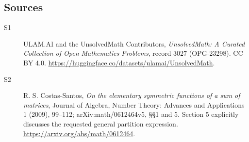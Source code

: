 \documentclass[11pt]{article}
\begin{document}
\subsection{Sources}
\begin{description}
\item[\hypertarget{source:3027:1}{S1}] ULAM.AI and the UnsolvedMath Contributors, \emph{UnsolvedMath: A Curated Collection of Open Mathematics Problems}, record 3027 (OPG-23298). CC BY 4.0. \url{https://huggingface.co/datasets/ulamai/UnsolvedMath}.
\item[\hypertarget{source:3027:2}{S2}] R. S. Costas-Santos, \emph{On the elementary symmetric functions of a sum of matrices}, Journal of Algebra, Number Theory: Advances and Applications 1 (2009), 99--112; arXiv:math/0612464v5, §§1 and 5. Section 5 explicitly discusses the requested general partition expression. \url{https://arxiv.org/abs/math/0612464}.
\end{description}
\label{end:3027}
\end{document}
